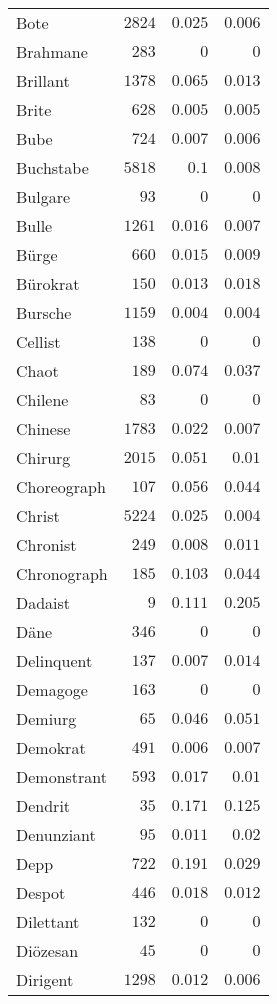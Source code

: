\begin{supertabular}{lrrr}
Bote & $2824$ & $0.025$ & $0.006$ \\
Brahmane & $283$ & $0$ & $0$ \\
Brillant & $1378$ & $0.065$ & $0.013$ \\
Brite & $628$ & $0.005$ & $0.005$ \\
Bube & $724$ & $0.007$ & $0.006$ \\
Buchstabe & $5818$ & $0.1$ & $0.008$ \\
Bulgare & $93$ & $0$ & $0$ \\
Bulle & $1261$ & $0.016$ & $0.007$ \\
Bürge & $660$ & $0.015$ & $0.009$ \\
Bürokrat & $150$ & $0.013$ & $0.018$ \\
Bursche & $1159$ & $0.004$ & $0.004$ \\
Cellist & $138$ & $0$ & $0$ \\
Chaot & $189$ & $0.074$ & $0.037$ \\
Chilene & $83$ & $0$ & $0$ \\
Chinese & $1783$ & $0.022$ & $0.007$ \\
Chirurg & $2015$ & $0.051$ & $0.01$ \\
Choreograph & $107$ & $0.056$ & $0.044$ \\
Christ & $5224$ & $0.025$ & $0.004$ \\
Chronist & $249$ & $0.008$ & $0.011$ \\
Chronograph & $185$ & $0.103$ & $0.044$ \\
Dadaist & $9$ & $0.111$ & $0.205$ \\
Däne & $346$ & $0$ & $0$ \\
Delinquent & $137$ & $0.007$ & $0.014$ \\
Demagoge & $163$ & $0$ & $0$ \\
Demiurg & $65$ & $0.046$ & $0.051$ \\
Demokrat & $491$ & $0.006$ & $0.007$ \\
Demonstrant & $593$ & $0.017$ & $0.01$ \\
Dendrit & $35$ & $0.171$ & $0.125$ \\
Denunziant & $95$ & $0.011$ & $0.02$ \\
Depp & $722$ & $0.191$ & $0.029$ \\
Despot & $446$ & $0.018$ & $0.012$ \\
Dilettant & $132$ & $0$ & $0$ \\
Diözesan & $45$ & $0$ & $0$ \\
Dirigent & $1298$ & $0.012$ & $0.006$ \\

\end{supertabular}
